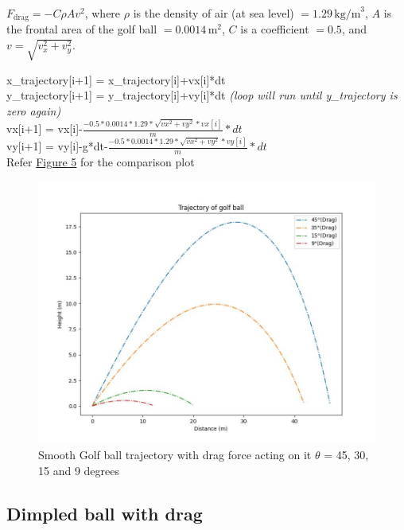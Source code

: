 \documentclass[11pt]{article}
\begin{document}
\(F_{\text{drag}} = -C \rho A v^2\), 
where \(\rho\) is the density of air (at sea level) \(= 1.29 \, \text{kg/m}^3\), \(A\) is the frontal area of the golf ball \(= 0.0014 \, \text{m}^2\), \(C\) is a coefficient \(= 0.5\), and \(v = \sqrt{v_x^2 + v_y^2}\).
\begin{raggedright}
\begin{justify}
x\_trajectory[i+1] = x\_trajectory[i]+vx[i]*dt\\
y\_trajectory[i+1] = y\_trajectory[i]+vy[i]*dt \textit{(loop will run until y\_trajectory is zero again)}\\
vx[i+1] = vx[i]-$\frac{-0.5*0.0014*1.29*\sqrt{vx^2+vy^2}*vx[i]}{m}*dt$\\
vy[i+1] = vy[i]-g*dt-$\frac{-0.5*0.0014*1.29*\sqrt{vx^2+vy^2}*vy[i]}{m}*dt$\\
Refer \hyperref[fig:Smooth_Fdrag_trajectory]{Figure 5} for the comparison plot
\end{justify}
\end{raggedright}


\begin{figure}[b]
    \centering
    \includegraphics[width=\textwidth, height=\textheight, keepaspectratio]{Golf_Trajectory_Smooth_Drag.jpeg}
    \caption{Smooth Golf ball trajectory with drag force acting on it $\theta$ = 45, 30, 15 and 9 degrees}
    \label{fig:Smooth_Fdrag_trajectory}
\end{figure}

\subsection{Dimpled ball with drag}
\end{document}
